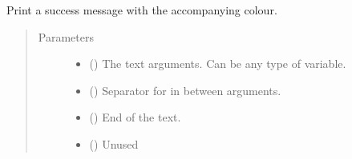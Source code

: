\documentclass[letterpaper,10pt,english]{sphinxmanual}
\begin{document}
\begin{fulllineitems}
\label{\detokenize{EntroPass:EntroPass.print_utils.success}}
\sphinxAtStartPar
Print a success message with the accompanying colour.
\begin{quote}\begin{description}
\item[{Parameters}] \leavevmode\begin{itemize}
\item {} 
\sphinxAtStartPar
{} () \textendash{} The text arguments. Can be any type of variable.

\item {} 
\sphinxAtStartPar
{} (\sphinxstyleliteralemphasis{\sphinxupquote{, }}) \textendash{} Separator for in between arguments.

\item {} 
\sphinxAtStartPar
{} (\sphinxstyleliteralemphasis{\sphinxupquote{, }}) \textendash{} End of the text.

\item {} 
\sphinxAtStartPar
{} () \textendash{} Unused

\end{itemize}

\end{description}\end{quote}

\end{fulllineitems}

\end{document}
